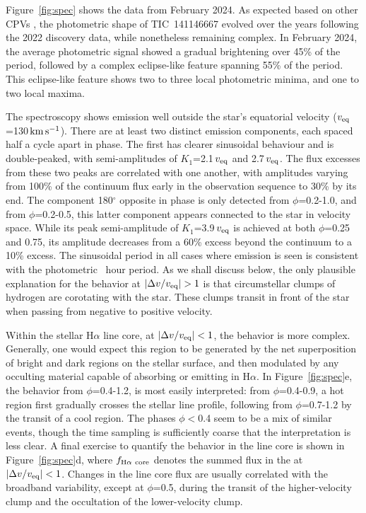 \documentclass{nature3}
\newcommand{\kms}{\ensuremath{\rm km\,s^{-1}}}
\begin{document}
Figure~\ref{fig:spec} shows the data from February 2024.  As expected
based on other CPVs \cite{Bouma2024}, the photometric shape of
TIC~141146667 evolved over the years following the 2022 discovery
data, while nonetheless remaining complex.  In February 2024, the
average photometric signal showed a gradual brightening over 45\% of
the period, followed by a complex eclipse-like feature spanning 55\%
of the period.  This eclipse-like feature shows two to three
local photometric minima, and one to two local maxima.

The spectroscopy shows emission well outside the star's
equatorial velocity ($v_{\rm eq}$=130\,\kms).  There are at least two
distinct emission components, each spaced half a cycle apart in phase.  The
first has clearer sinusoidal behaviour and is double-peaked, with
semi-amplitudes of $K_1$=2.1\,$v_{\rm eq}$ and 2.7\,$v_{\rm eq}$.  The
flux excesses from these two peaks are correlated with one another,
with amplitudes varying from 100\% of the continuum flux early in the
observation sequence to 30\% by its end.  The component 180$^\circ$
opposite in phase is only detected from $\phi$=0.2-1.0, and 
from $\phi$=0.2-0.5, this latter component appears connected to the
star in velocity space.  While its peak semi-amplitude of
$K_1$=3.9\,$v_{\rm eq}$ is achieved at both $\phi$=0.25 and 0.75, its
amplitude decreases from a 60\% excess beyond the continuum to a 10\%
excess.   The sinusoidal period in all cases where emission is seen is
consistent with the photometric \periodhr\ hour period.  As we shall
discuss below, the only plausible explanation for the behavior at
$|\Delta v / v_{\rm eq}|>1$ is that circumstellar clumps of hydrogen
are corotating with the star.  These clumps transit in front of the
star when passing from negative to positive velocity.

Within the stellar H$\alpha$ line core, at $|\Delta v / v_{\rm
eq}|<1$, the behavior is more complex.  Generally, one would
expect this region to be generated by the net superposition of bright
and dark regions on the stellar surface, and then modulated by any
occulting material capable of absorbing or emitting in H$\alpha$.  In
Figure~\ref{fig:spec}e, the behavior from $\phi$=0.4-1.2, is most easily
interpreted: from $\phi$=0.4-0.9, a hot region first gradually crosses
the stellar line profile, following from $\phi$=0.7-1.2 by the transit
of a cool region.  The phases $\phi$$<$0.4 seem to be a mix of similar
events, though the time sampling is sufficiently coarse that the
interpretation is less clear.
A final exercise to quantify the behavior in the line core is
shown in Figure~\ref{fig:spec}d, where $f_{\rm H\alpha\ core}$ denotes
the summed flux in the at $|\Delta v / v_{\rm eq}|<1$.
Changes in the line core flux are usually correlated with the
broadband variability, except at $\phi$=0.5, during the transit of the
higher-velocity clump and the occultation of the lower-velocity clump.
\end{document}
